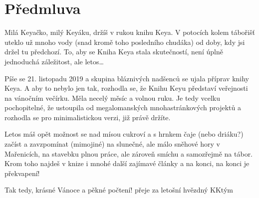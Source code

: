 
\chapter{Předmluva} %
\label{cha:předmluva}

Milá Keyačko, milý Keyáku,
držíš v rukou knihu Keya. V potocích kolem tábořišť uteklo už mnoho vody (snad kromě toho posledního chudáka) od doby, kdy jsi držel tu předchozí. To, aby se Kniha Keya stala skutečností, není úplně jednoduchá záležitost, ale letos…

Píše se 21. listopadu 2019 a skupina bláznivých nadšenců se ujala příprav knihy Keya. A aby to nebylo jen tak, rozhodla se, že Knihu Keyu představí veřejnosti na vánočním večírku. Měla necelý měsíc a volnou ruku. Je tedy vcelku pochopitelné, že ustoupila od megalomanských mnohastránkových projektů a rozhodla se pro minimalistickou verzi, již právě držíte.

Letos máš opět možnost se nad mísou cukroví a s hrnkem čaje (nebo driáku?) začíst a zavzpomínat (mimojiné) na slunečné, ale málo sněhové hory v Mařenicích, na stavebku plnou práce, ale zároveň smíchu a samozřejmě na tábor. Krom toho najdeš v knize i mnohé další zajímavé články a na konci, na konci je překvapení!

Tak tedy, krásné Vánoce a pěkné počtení!
přeje za letošní hvězdný KKtým

\restoregeometry

\clearpage